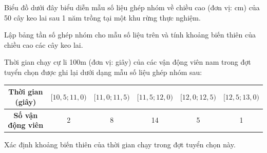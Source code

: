 \documentclass[12pt]{article}
\begin{document}
	\begin{btvang}[title={Bài 3}]
		Biểu đồ dưới đây biểu diễn mẫu số liệu ghép nhóm về chiều cao (đơn vị: cm) của 50 cây keo lai sau 1 năm trồng tại một khu rừng thực nghiệm.
		\begin{center}
		\end{center}
		Lập bảng tần số ghép nhóm cho mẫu số liệu trên và tính khoảng biến thiên của chiều cao các cây keo lai.
	\end{btvang}
	
	\begin{btvang}[title={Bài 4}]
		Thời gian chạy cự li 100m (đơn vị: giây) của các vận động viên nam trong đợt tuyển chọn được ghi lại dưới dạng mẫu số liệu ghép nhóm sau:
		\begin{center}
			\renewcommand{\arraystretch}{1.3}
			\begin{tabular}{|c|c|c|c|c|c|}
				\hline
				\textbf{Thời gian (giây)} & $[10,5; 11,0)$ & $[11,0; 11,5)$ & $[11,5; 12,0)$ & $[12,0; 12,5)$ & $[12,5; 13,0)$ \\
				\hline
				\textbf{Số vận động viên} & 2 & 8 & 14 & 5 & 1 \\
				\hline
			\end{tabular}
		\end{center}
		Xác định khoảng biến thiên của thời gian chạy trong đợt tuyển chọn này.
	\end{btvang}
	
\end{document}
